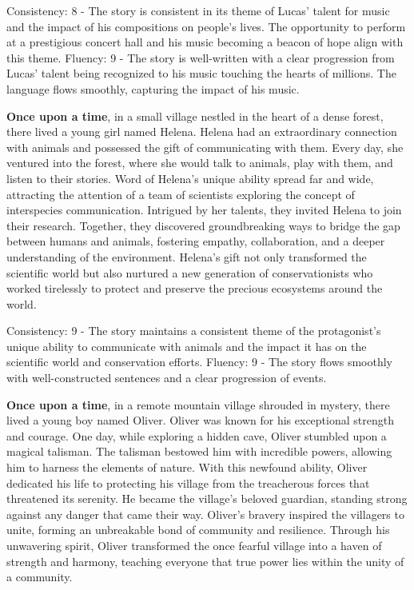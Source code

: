 \documentclass{article}
\begin{document}
Consistency: 8 - The story is consistent in its theme of Lucas' talent for music and the impact of his compositions on people's lives. The opportunity to perform at a prestigious concert hall and his music becoming a beacon of hope align with this theme.
Fluency: 9 - The story is well-written with a clear progression from Lucas' talent being recognized to his music touching the hearts of millions. The language flows smoothly, capturing the impact of his music.

\textbf{Once upon a time}, in a small village nestled in the heart of a dense forest, there lived a young girl named Helena. Helena had an extraordinary connection with animals and possessed the gift of communicating with them. Every day, she ventured into the forest, where she would talk to animals, play with them, and listen to their stories. Word of Helena's unique ability spread far and wide, attracting the attention of a team of scientists exploring the concept of interspecies communication. Intrigued by her talents, they invited Helena to join their research. Together, they discovered groundbreaking ways to bridge the gap between humans and animals, fostering empathy, collaboration, and a deeper understanding of the environment. Helena's gift not only transformed the scientific world but also nurtured a new generation of conservationists who worked tirelessly to protect and preserve the precious ecosystems around the world.

Consistency: 9 - The story maintains a consistent theme of the protagonist's unique ability to communicate with animals and the impact it has on the scientific world and conservation efforts.
Fluency: 9 - The story flows smoothly with well-constructed sentences and a clear progression of events.

\textbf{Once upon a time}, in a remote mountain village shrouded in mystery, there lived a young boy named Oliver. Oliver was known for his exceptional strength and courage. One day, while exploring a hidden cave, Oliver stumbled upon a magical talisman. The talisman bestowed him with incredible powers, allowing him to harness the elements of nature. With this newfound ability, Oliver dedicated his life to protecting his village from the treacherous forces that threatened its serenity. He became the village's beloved guardian, standing strong against any danger that came their way. Oliver's bravery inspired the villagers to unite, forming an unbreakable bond of community and resilience. Through his unwavering spirit, Oliver transformed the once fearful village into a haven of strength and harmony, teaching everyone that true power lies within the unity of a community.
\end{document}
